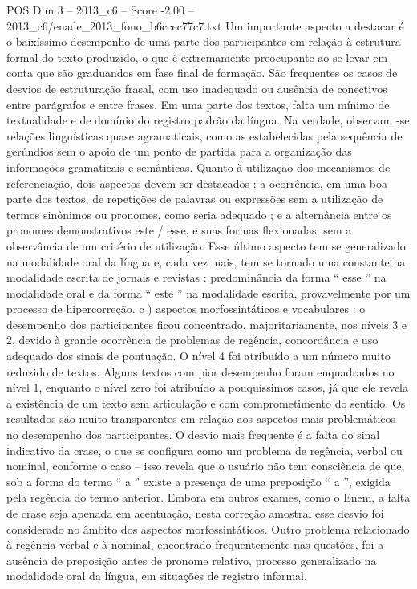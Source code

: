 \begin{textsample}{POS Dim 3 – 2013\_c6 – Score -2.00 – 2013\_c6/enade\_2013\_fono\_b6ccec77c7.txt}
Um importante aspecto a destacar é o baixíssimo desempenho de uma parte dos participantes em relação à estrutura formal do texto produzido, o que é extremamente preocupante ao se levar em conta que são graduandos em fase final de formação.
São frequentes os casos de desvios de estruturação frasal, com uso inadequado ou ausência de conectivos entre parágrafos e entre frases.
Em uma parte dos textos, falta um mínimo de textualidade e de domínio do registro padrão da língua.
Na verdade, observam -se relações linguísticas quase agramaticais, como as estabelecidas pela sequência de gerúndios sem o apoio de um ponto de partida para a organização das informações gramaticais e semânticas.
Quanto à utilização dos mecanismos de referenciação, dois aspectos devem ser destacados : a ocorrência, em uma boa parte dos textos, de repetições de palavras ou expressões sem a utilização de termos sinônimos ou pronomes, como seria adequado ; e a alternância entre os pronomes demonstrativos este / esse, e suas formas flexionadas, sem a observância de um critério de utilização.
Esse último aspecto tem se generalizado na modalidade oral da língua e, cada vez mais, tem se tornado uma constante na modalidade escrita de jornais e revistas : predominância da forma “ esse ” na modalidade oral e da forma “ este ” na modalidade escrita, provavelmente por um processo de hipercorreção. c ) aspectos morfossintáticos e vocabulares : o desempenho dos participantes ficou concentrado, majoritariamente, nos níveis 3 e 2, devido à grande ocorrência de problemas de regência, concordância e uso adequado dos sinais de pontuação.
O nível 4 foi atribuído a um número muito reduzido de textos.
Alguns textos com pior desempenho foram enquadrados no nível 1, enquanto o nível zero foi atribuído a pouquíssimos casos, já que ele revela a existência de um texto sem articulação e com comprometimento do sentido.
Os resultados são muito transparentes em relação aos aspectos mais problemáticos no desempenho dos participantes.
O desvio mais frequente é a falta do sinal indicativo da crase, o que se configura como um problema de regência, verbal ou nominal, conforme o caso – isso revela que o usuário não tem consciência de que, sob a forma do termo “ a ” existe a presença de uma preposição “ a ”, exigida pela regência do termo anterior.
Embora em outros exames, como o Enem, a falta de crase seja apenada em acentuação, nesta correção amostral esse desvio foi considerado no âmbito dos aspectos morfossintáticos.
Outro problema relacionado à regência verbal e à nominal, encontrado frequentemente nas questões, foi a ausência de preposição antes de pronome relativo, processo generalizado na modalidade oral da língua, em situações de registro informal.

\end{textsample}
